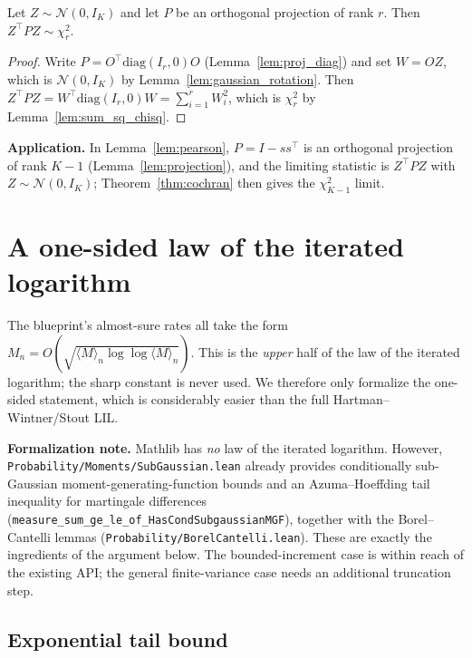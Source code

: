 \begin{theorem}\label{thm:cochran}
Let $Z\sim\mathcal{N}(0,I_K)$ and let $P$ be an orthogonal projection of rank $r$.
Then $Z^\top P Z\sim\chi^2_r$.
\end{theorem}

\begin{proof}
Write $P = O^\top\mathrm{diag}(I_r,0)O$ (Lemma~\ref{lem:proj_diag}) and set
$W = OZ$, which is $\mathcal{N}(0,I_K)$ by Lemma~\ref{lem:gaussian_rotation}.
Then $Z^\top P Z = W^\top\mathrm{diag}(I_r,0)W = \sum_{i=1}^r W_i^2$, which is
$\chi^2_r$ by Lemma~\ref{lem:sum_sq_chisq}.
\end{proof}

\textbf{Application.} In Lemma~\ref{lem:pearson}, $P = I - ss^\top$ is an
orthogonal projection of rank $K-1$ (Lemma~\ref{lem:projection}), and the limiting
statistic is $Z^\top P Z$ with $Z\sim\mathcal{N}(0,I_K)$; Theorem~\ref{thm:cochran}
then gives the $\chi^2_{K-1}$ limit.


\chapter{A one-sided law of the iterated logarithm}
\label{chap:pre_lil}

The blueprint's almost-sure rates all take the form
$M_n = O(\sqrt{\langle M\rangle_n \log\log\langle M\rangle_n})$. This is the
\emph{upper} half of the law of the iterated logarithm; the sharp constant is
never used. We therefore only formalize the one-sided statement, which is
considerably easier than the full Hartman--Wintner/Stout LIL.

\textbf{Formalization note.} Mathlib has \emph{no} law of the iterated logarithm.
However, \texttt{Probability/Moments/SubGaussian.lean} already provides
conditionally sub-Gaussian moment-generating-function bounds and an
Azuma--Hoeffding tail inequality for martingale differences
(\texttt{measure\_sum\_ge\_le\_of\_HasCondSubgaussianMGF}), together with the
Borel--Cantelli lemmas (\texttt{Probability/BorelCantelli.lean}). These are
exactly the ingredients of the argument below. The bounded-increment case is
within reach of the existing API; the general finite-variance case needs an
additional truncation step.

\section{Exponential tail bound}
\label{sec:pre_lil_tail}


